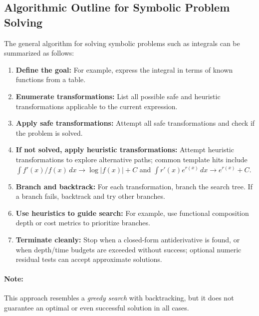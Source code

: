 \subsection{Algorithmic Outline for Symbolic Problem Solving}
\label{sec:symbolic_algorithmic_outline_for_symbolic_problem_solving}

The general algorithm for solving symbolic problems such as integrals can be summarized as follows:

\begin{enumerate}
  \item \textbf{Define the goal:} For example, express the integral in terms of known functions from a table.
  \item \textbf{Enumerate transformations:} List all possible safe and heuristic transformations applicable to the current expression.
  \item \textbf{Apply safe transformations:} Attempt all safe transformations and check if the problem is solved.
  \item \textbf{If not solved, apply heuristic transformations:} Attempt heuristic transformations to explore alternative paths; common template hits include \(\int f'(x)/f(x)\, dx \to \log|f(x)|+C\) and \(\int r'(x)e^{r(x)}\, dx \to e^{r(x)}+C\).
  \item \textbf{Branch and backtrack:} For each transformation, branch the search tree. If a branch fails, backtrack and try other branches.
  \item \textbf{Use heuristics to guide search:} For example, use functional composition depth or cost metrics to prioritize branches.
  \item \textbf{Terminate cleanly:} Stop when a closed-form antiderivative is found, or when depth/time budgets are exceeded without success; optional numeric residual tests can accept approximate solutions.
\end{enumerate}

\paragraph{Note:} This approach resembles a \emph{greedy search} with backtracking, but it does not guarantee an optimal or even successful solution in all cases.

